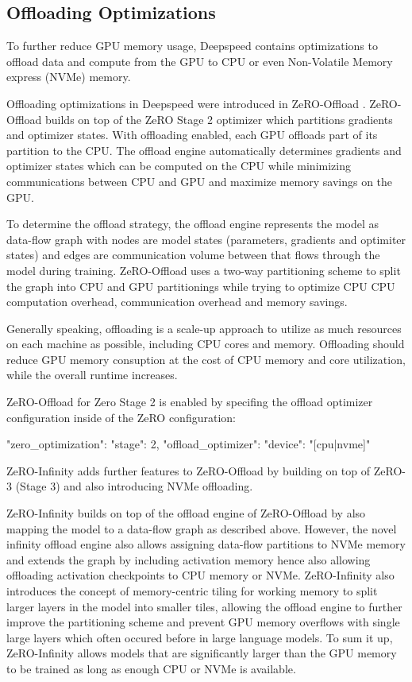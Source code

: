 \subsection{Offloading Optimizations}
\label{subsection:offloading}

To further reduce GPU memory usage, Deepspeed contains optimizations to offload 
data and compute from the GPU to CPU or even Non-Volatile Memory express (NVMe) 
memory. 

Offloading optimizations in Deepspeed were introduced in ZeRO-Offload 
\cite*{DBLP:journals/corr/abs-2101-06840}. ZeRO-Offload builds on top of 
the ZeRO Stage 2 optimizer which partitions gradients and optimizer states. 
With offloading enabled, each GPU offloads part of its partition to the CPU. 
The offload engine automatically determines gradients and optimizer states 
which can be computed on the CPU while minimizing communications between CPU 
and GPU and maximize memory savings on the GPU.

To determine the offload strategy, the offload engine represents the model as 
data-flow graph with nodes are model states (parameters, gradients and 
optimiter states) and edges are communication volume between that flows through 
the model during training. ZeRO-Offload uses a two-way partitioning scheme to 
split the graph into CPU and GPU partitionings while trying to optimize CPU 
CPU computation overhead, communication overhead and memory savings. 

Generally speaking, offloading is a scale-up approach to utilize as much 
resources on each machine as possible, including CPU cores and memory. 
Offloading should reduce GPU memory consuption at the cost of CPU memory and 
core utilization, while the overall runtime increases.

ZeRO-Offload for Zero Stage 2 is enabled by specifing the offload optimizer 
configuration inside of the ZeRO configuration:

\begin{json}
{
    "zero_optimization": {
        "stage": 2,
        "offload_optimizer": {
            "device": "[cpu|nvme]"
        }
    }
}
\end{json}

ZeRO-Infinity \cite*{DBLP:journals/corr/abs-2104-07857} adds further features to 
ZeRO-Offload by building on top of ZeRO-3 (Stage 3) and also introducing NVMe 
offloading.

ZeRO-Infinity builds on top of the offload engine of ZeRO-Offload by also 
mapping the model to a data-flow graph as described above. However, the 
novel infinity offload engine also allows assigning data-flow partitions 
to NVMe memory and extends the graph by including activation memory hence 
also allowing offloading activation checkpoints to CPU memory or NVMe. 
ZeRO-Infinity also introduces the concept of memory-centric tiling for 
working memory to split larger layers in the model into smaller tiles, 
allowing the offload engine to further improve the partitioning scheme and 
prevent GPU memory overflows with single large layers which often occured 
before in large language models.   To sum it up, ZeRO-Infinity allows 
models that are significantly larger than the GPU memory to be trained as 
long as enough CPU or NVMe is available. 

